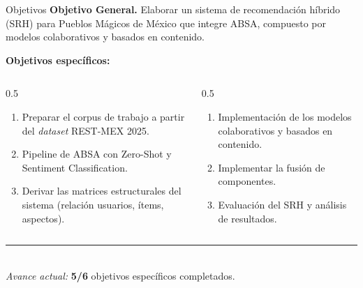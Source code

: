 \documentclass[aspectratio=169,11pt]{beamer}
\begin{document}
\begin{frame}{Objetivos}
	\small
	\textbf{Objetivo General.}\;
	Elaborar un sistema de recomendaci\'on h\'ibrido (SRH) para Pueblos M\'agicos de M\'exico que integre ABSA, compuesto por modelos colaborativos y basados en contenido.

	\vspace{0.6em}
	\textbf{Objetivos espec\'ificos:}
	\begin{columns}[T]
		\begin{column}{0.5\linewidth}
			\begin{enumerate}\setlength\itemsep{3pt}
				\item[\color{accentC}\ding{51}] Preparar el corpus de trabajo a partir del \textit{dataset} REST-MEX 2025.
				\item[\color{accentC}\ding{51}] Pipeline de ABSA con Zero-Shot y Sentiment Classification.
				\item[\color{accentC}\ding{51}] Derivar las matrices estructurales del sistema (relaci\'on usuarios, \'items, aspectos).
			\end{enumerate}
		\end{column}
		\begin{column}{0.5\linewidth}
			\begin{enumerate}\setlength\itemsep{3pt}
				\item[\color{accentC}\ding{51}] Implementaci\'on de los modelos colaborativos y basados en contenido.
				\item[\color{accentC}\ding{51}] Implementar la fusi\'on de componentes.
				\item[$\square$] Evaluación del SRH y análisis de resultados.
			\end{enumerate}
		\end{column}
	\end{columns}

	\vspace{0.6em}
	\centering
	{\color{rule}\rule{0.4\linewidth}{0.4pt}}\\[0.3em]
	\textit{Avance actual:} \textbf{5/6} objetivos espec\'ificos completados.
\end{frame}
\end{document}
